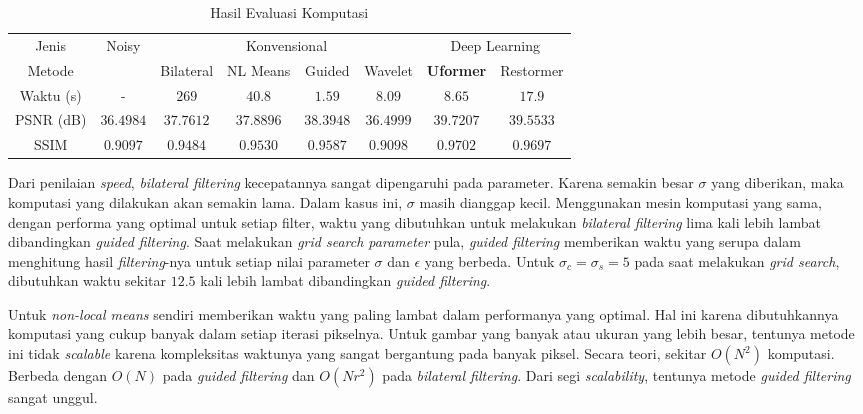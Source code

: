 \documentclass[11pt, a4paper, final]{report}
\begin{document}
\begin{table}[H]
\centering
\begin{tabular}{|c|c|cccc|cc|}
\hline
Jenis                   & \multirow{2}{*}{Noisy} & \multicolumn{4}{c|}{Konvensional}                                                                            & \multicolumn{2}{c|}{Deep Learning}         \\ \cline{1-1} \cline{3-8} 
Metode                  &                               & \multicolumn{1}{c|}{Bilateral} & \multicolumn{1}{c|}{NL Means}  & \multicolumn{1}{c|}{Guided}    & Wavelet   & \multicolumn{1}{c|}{\textbf{Uformer}}   & Restormer \\ \hline
Waktu (s) & -                             & \multicolumn{1}{c|}{$269$}     & \multicolumn{1}{c|}{$40.8$}    & \multicolumn{1}{c|}{$\mathbf{1.59}$}    & $8.09$    & \multicolumn{1}{c|}{$8.65$}    & $17.9$    \\ \hline
PSNR (dB)               & $36.4984$                     & \multicolumn{1}{c|}{$37.7612$} & \multicolumn{1}{c|}{$37.8896$} & \multicolumn{1}{c|}{$38.3948$} & $36.4999$ & \multicolumn{1}{c|}{$\mathbf{39.7207}$} & $39.5533$ \\ \hline
SSIM                    & $0.9097$                      & \multicolumn{1}{c|}{$0.9484$}  & \multicolumn{1}{c|}{$0.9530$}  & \multicolumn{1}{c|}{$0.9587$}  & $0.9098$  & \multicolumn{1}{c|}{$\mathbf{0.9702}$}  & $0.9697$  \\ \hline
\end{tabular}
    \caption{Hasil Evaluasi Komputasi}
\end{table}

Dari penilaian \textit{speed}, \textit{bilateral filtering} kecepatannya sangat dipengaruhi pada parameter. Karena semakin besar $\sigma$ yang diberikan, maka komputasi yang dilakukan akan semakin lama. Dalam kasus ini, $\sigma$ masih dianggap kecil. Menggunakan mesin komputasi yang sama, dengan performa yang optimal untuk setiap filter, waktu yang dibutuhkan untuk melakukan \textit{bilateral filtering} lima kali lebih lambat dibandingkan \textit{guided filtering}. Saat melakukan \textit{grid search parameter} pula, \textit{guided filtering} memberikan waktu yang serupa dalam menghitung hasil \textit{filtering}-nya untuk setiap nilai parameter $\sigma$ dan $\epsilon$ yang berbeda. Untuk $\sigma_c = \sigma_s = 5$ pada saat melakukan \textit{grid search}, dibutuhkan waktu sekitar $12.5$ kali lebih lambat dibandingkan \textit{guided filtering}.

Untuk \textit{non-local means} sendiri memberikan waktu yang paling lambat dalam performanya yang optimal. Hal ini karena dibutuhkannya komputasi yang cukup banyak dalam setiap iterasi pikselnya. Untuk gambar yang banyak atau ukuran yang lebih besar, tentunya metode ini tidak \textit{scalable} karena kompleksitas waktunya yang sangat bergantung pada banyak piksel. Secara teori, sekitar $O(N^2)$ komputasi. Berbeda dengan $O(N)$ pada \textit{guided filtering} dan $O(Nr^2)$ pada \textit{bilateral filtering}. Dari segi \textit{scalability}, tentunya metode \textit{guided filtering} sangat unggul.
\end{document}
